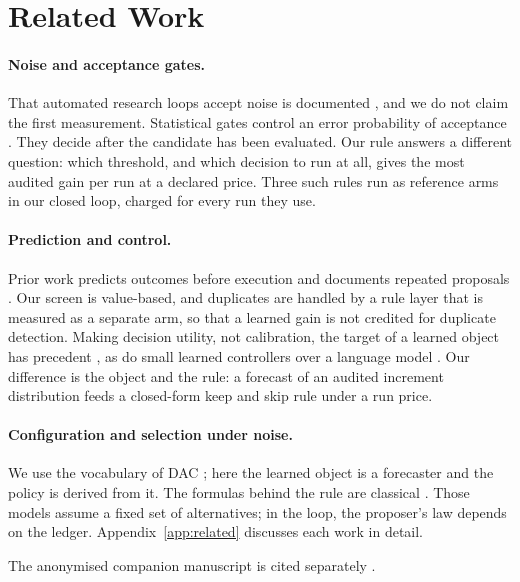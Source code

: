 \section{Related Work}
\label{sec:related}

\paragraph{Noise and acceptance gates.}
That automated research loops accept noise is documented \citep{jalaian2026noise,grover2026lucky}, and we do not claim the first measurement. Statistical gates control an error probability of acceptance \citep{wang2026sage,shawn2026pace,sgm2025,lonkar2026evidence,blum2015ladder}. They decide after the candidate has been evaluated. Our rule answers a different question: which threshold, and which decision to run at all, gives the most audited gain per run at a declared price. Three such rules run as reference arms in our closed loop, charged for every run they use.

\paragraph{Prediction and control.}
Prior work predicts outcomes before execution \citep{zheng2026foreagent,arxiv240416795,liu2024llambo} and documents repeated proposals \citep{he2026beneath,chen2026visible}. Our screen is value-based, and duplicates are handled by a rule layer that is measured as a separate arm, so that a learned gain is not credited for duplicate detection. Making decision utility, not calibration, the target of a learned object has precedent \citep{zhang2026calibrationcontrol,shao2026deeppersonalization,arxiv171008005,wilder2019melding}, as do small learned controllers over a language model \citep{arxiv260211574,yi2026harnessmdp}. Our difference is the object and the rule: a forecast of an audited increment distribution feeds a closed-form keep and skip rule under a run price.

\paragraph{Configuration and selection under noise.}
We use the vocabulary of DAC \citep{biedenkapp2020dac,adriaensen2022dac,eimer2021dacbench}; here the learned object is a forecaster and the policy is derived from it. The formulas behind the rule are classical \citep{xie2013sequential,chick2012sequential,frazier2008knowledge,birattari2002frace,smith2006optimizer}. Those models assume a fixed set of alternatives; in the loop, the proposer's law depends on the ledger. Appendix~\ref{app:related} discusses each work in detail.

The anonymised companion manuscript is cited separately \citep{anonymouscompanion}. 
